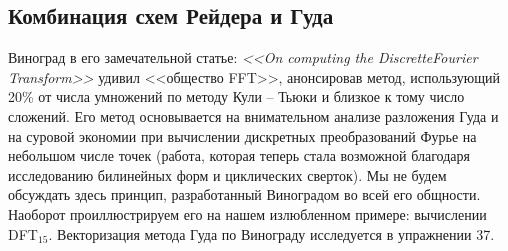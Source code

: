 \documentclass{mai_book}
\begin{document}
\subsection{Комбинация схем Рейдера и Гуда}
Виноград в его замечательной статье: \textit{<<On computing the Discrette\linebreak Fourier Transform>>} удивил <<общество FFT>>, анонсировав метод, использующий 20\% от числа умножений по методу Кули -- Тьюки и близкое к тому число сложений. Его метод основывается на внимательном анализе разложения Гуда и на суровой экономии при вычислении дискретных преобразований Фурье на небольшом числе точек (работа, которая теперь стала возможной благодаря исследованию билинейных форм и циклических сверток). Мы не будем обсуждать здесь принцип, разработанный Виноградом во всей его общности. Наоборот проиллюстрируем его на нашем излюбленном примере: вычислении D{\footnotesize FT}$_{15}$. Векторизация метода Гуда по Винограду исследуется в упражнении 37. 
\end{document}
